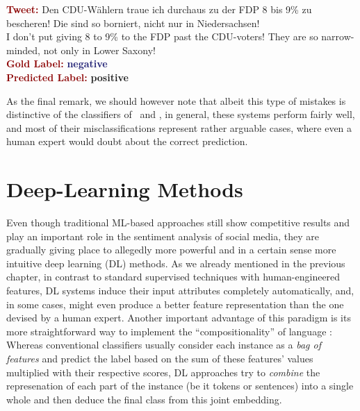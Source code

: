 \begin{example}\label{snt:cgsa:exmp:guenther-error}
  \noindent\textup{\bfseries\textcolor{darkred}{Tweet:}} {\upshape Den CDU-W\"ahlern traue ich durchaus zu der FDP 8 bis 9\% zu bescheren! Die sind so borniert, nicht nur in Niedersachsen!}\\
  \noindent I don't put giving 8 to 9\% to the FDP past the CDU-voters!  They are so narrow-minded, not only in Lower Saxony!\\[\exampleSep]
  \noindent\textup{\bfseries\textcolor{darkred}{Gold Label:}}\hspace*{4.3em}\textbf{%
    \upshape\textcolor{midnightblue}{negative}}\\
 \noindent\textup{\bfseries\textcolor{darkred}{Predicted Label:}}\hspace*{2em}\textbf{%
    \upshape\textcolor{green3}{positive}}
\end{example}

As the final remark, we should however note that albeit this type of
mistakes is distinctive of the classifiers of~\citet{Mohammad:13} and
\citet{Guenther:14}, in general, these systems perform fairly well,
and most of their misclassifications represent rather arguable cases,
where even a human expert would doubt about the correct prediction.

\section{Deep-Learning Methods}\label{sec:cgsa:dl-based}

Even though traditional ML-based approaches still show competitive
results and play an important role in the sentiment analysis of social
media, they are gradually giving place to allegedly more powerful and
in a certain sense more intuitive deep learning (DL) methods.  As we
already mentioned in the previous chapter, in contrast to standard
supervised techniques with human-engineered features, DL systems
induce their input attributes completely automatically, and, in some
cases, might even produce a better feature representation than the one
devised by a human expert.  Another important advantage of this
paradigm is its more straightforward way to implement the
``compositionality'' of language \cite{Frege:1892}: Whereas
conventional classifiers usually consider each instance as a \emph{bag
  of features} and predict the label based on the sum of these
features' values multiplied with their respective scores, DL
approaches try to \emph{combine} the represenation of each part of the
instance (be it tokens or sentences) into a single whole and then
deduce the final class from this joint embedding.

